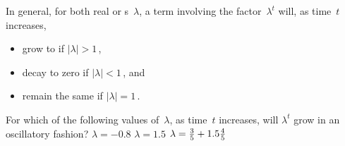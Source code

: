 In general, for both real or s~\(\lambda\), a term involving the factor~\(\lambda^t\) will, as time~\(t\) increases,
\begin{itemize}
\item grow to  if \(|\lambda|>1\)\,,
\item decay to zero if \(|\lambda|<1\)\,, and
\item remain the same  if \(|\lambda|=1\)\,.
\end{itemize}




\begin{activity}
For which of the following values of~\(\lambda\), as time~\(t\) increases, will \(\lambda^t\) grow in an oscillatory fashion?
{\(\lambda=-0.8\)}
{\(\lambda=1.5\)}
{\(\lambda=\frac35+1.5\frac45\)}
\end{activity}




